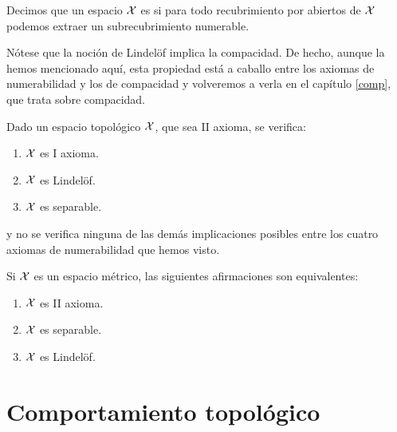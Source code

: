 \begin{defi}[Lindelöf]
	\label{lindel}
	Decimos que un espacio $\mathcal{X}$ es  si para todo recubrimiento por abiertos de $\mathcal{X}$ podemos extraer un subrecubrimiento numerable.
\end{defi}

\begin{obs}
	Nótese que la noción de Lindelöf implica la compacidad. De hecho, aunque la hemos mencionado aquí, esta propiedad está a caballo entre los axiomas de numerabilidad y los de compacidad y volveremos a verla en el capítulo \ref{comp}, que trata sobre compacidad.
\end{obs}

\begin{prop}
	Dado un espacio topológico $\mathcal{X}$, que sea II axioma, se verifica:
	\begin{enumerate}
		\item $\mathcal{X}$ es I axioma.
		\item $\mathcal{X}$ es Lindelöf.
		\item $\mathcal{X}$ es separable.
	\end{enumerate}
	y no se verifica ninguna de las demás implicaciones posibles entre los cuatro axiomas de numerabilidad que hemos visto.
\end{prop}

\begin{obs}
	Si $\mathcal{X}$ es un espacio métrico, las siguientes afirmaciones son equivalentes:
	\begin{enumerate}
		\item $\mathcal{X}$ es II axioma.
		\item $\mathcal{X}$ es separable.
		\item $\mathcal{X}$ es Lindelöf. \qedhere
	\end{enumerate}
\end{obs}

\section{Comportamiento topológico}

